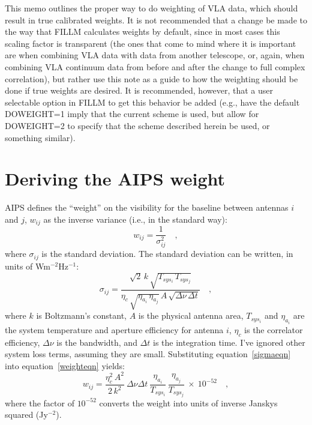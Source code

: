 \documentclass[11pt]{article}
\begin{document}
This memo outlines the proper way to do weighting of VLA data, which
should result in true calibrated weights.  It is not recommended that a
change be made to the way that FILLM calculates weights by default,
since in most cases this scaling factor is transparent (the ones that
come to mind where it is important are when combining VLA data with
data from another telescope, or, again, when combining VLA continuum
data from before and after the change to full complex correlation), but
rather use this note as a guide to how the weighting should be done if
true weights are desired.  It is recommended, however, that a user
selectable option in FILLM to get this behavior be added (e.g., have
the default DOWEIGHT=1 imply that the current scheme is used, but allow
for DOWEIGHT=2 to specify that the scheme described herein be used, or
something similar).

\section{Deriving the AIPS weight}

AIPS defines the ``weight'' on the visibility for the baseline between
antennas $i$ and $j$, $w_{ij}$ as the inverse variance (i.e., in the
standard way):
\begin{equation}
   \label{weighteqn}
   w_{ij} = \frac{1}{\sigma_{ij}^2} \quad ,
\end{equation}
where $\sigma_{ij}$ is the standard deviation.  The standard deviation
can be written, in units of Wm$^{-2}$Hz$^{-1}$:
\begin{equation}
   \label{sigmaeqn}
   \sigma_{ij} = \frac{\sqrt{2} \, k \, \sqrt{T_{sys_i} \, T_{sys_j}}}
                      {\eta_c \, \sqrt{\eta_{a_i} \, \eta_{a_j}} \, A \,
                       \sqrt{\Delta\nu \, \Delta{t}}}
   \quad ,
\end{equation}
where $k$ is Boltzmann's constant, $A$ is the physical antenna area,
$T_{sys_i}$ and $\eta_{a_i}$ are the system temperature and aperture
efficiency for antenna $i$, $\eta_c$ is the correlator efficiency,
$\Delta\nu$ is the bandwidth, and $\Delta{t}$ is the integration time.
I've ignored other system loss terms, assuming they are small.
Substituting equation~\ref{sigmaeqn} into equation~\ref{weighteqn}
yields:
\begin{equation}
   w_{ij} = \frac{\eta_c^2 \, A^2}{2 \, k^2} \ \Delta\nu \Delta{t} \
            \frac{\eta_{a_i}}{T_{sys_i}}\, \frac{\eta_{a_j}}{T_{sys_j}}\
            \times \ 10^{-52} \quad ,
\end{equation}
where the factor of $10^{-52}$ converts the weight into units of inverse
Janskys squared (Jy$^{-2}$).
\end{document}
